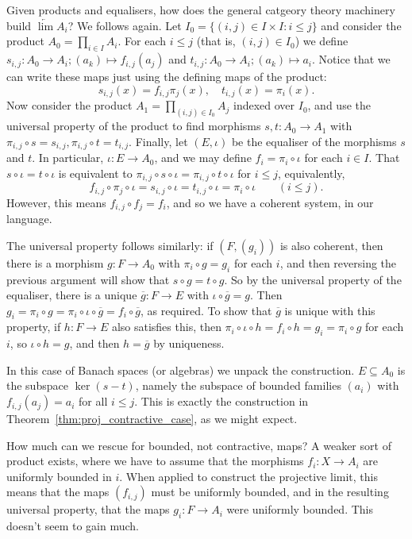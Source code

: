 \documentclass[a4paper,11pt]{article}
\theoremstyle{definition}
\begin{document}
Given products and equalisers, how does the general catgeory theory machinery build $\underleftarrow{\lim} A_i$?  We follows \cite{leinster} again.  Let $I_0 = \{ (i,j)\in I\times I : i\leq j \}$ and consider the product $A_0 = \prod_{i\in I} A_i$.  For each $i\leq j$ (that is, $(i,j)\in I_0$) we define $s_{i,j} \colon A_0 \to A_i; (a_k)\mapsto f_{i,j}(a_j)$ and $t_{i,j} \colon A_0 \to A_i; (a_k) \mapsto a_i$.  Notice that we can write these maps just using the defining maps of the product:
\[ s_{i,j}(x) = f_{i,j} \pi_j(x), \quad t_{i,j}(x) = \pi_i(x). \]
Now consider the product $A_1 = \prod_{(i,j)\in I_0} A_j$ indexed over $I_0$, and use the universal property of the product to find morphisms $s,t\colon A_0 \to A_1$ with $\pi_{i,j}\circ s = s_{i,j}, \pi_{i,j}\circ t = t_{i,j}$.  Finally, let $(E, \iota)$ be the equaliser of the morphisms $s$ and $t$.  In particular, $\iota \colon E \to A_0$, and we may define $f_i = \pi_i \circ \iota$ for each $i\in I$.  That $s\circ\iota = t\circ\iota$ is equivalent to $\pi_{i,j} \circ s \circ \iota = \pi_{i,j} \circ t \circ \iota$ for $i\leq j$, equivalently,
\[ f_{i,j} \circ \pi_j \circ \iota = s_{i,j} \circ \iota
= t_{i,j} \circ \iota = \pi_i \circ \iota \qquad (i\leq j). \]
However, this means $f_{i,j} \circ f_j = f_i$, and so we have a coherent system, in our language.

The universal property follows similarly: if $(F,(g_i))$ is also coherent, then there is a morphism $g \colon F \to A_0$ with $\pi_i\circ g = g_i$ for each $i$, and then reversing the previous argument will show that $s \circ g = t\circ g$.  So by the universal property of the equaliser, there is a unique $\overline g \colon F \to E$ with $\iota \circ \overline g = g$.  Then $g_i = \pi_i\circ g = \pi_i\circ\iota \circ \overline g = f_i\circ\overline g$, as required.  To show that $\overline g$ is unique with this property, if $h\colon F\to E$ also satisfies this, then $\pi_i\circ\iota\circ h = f_i \circ h = g_i = \pi_i\circ g$ for each $i$, so $\iota\circ h = g$, and then $h=\overline g$ by uniqueness.

In this case of Banach spaces (or algebras) we unpack the construction.  $E \subseteq A_0$ is the subspace $\ker(s-t)$, namely the subspace of bounded families $(a_i)$ with $f_{i,j}(a_j) = a_i$ for all $i\leq j$.  This is exactly the construction in Theorem~\ref{thm:proj_contractive_case}, as we might expect.

How much can we rescue for bounded, not contractive, maps?  A weaker sort of product exists, where we have to assume that the morphisms $f_i\colon X\to A_i$ are uniformly bounded in $i$.  When applied to construct the projective limit, this means that the maps $(f_{i,j})$ must be uniformly bounded, and in the resulting universal property, that the maps $g_i \colon F \to A_i$ were uniformly bounded.  This doesn't seem to gain much.
\end{document}
